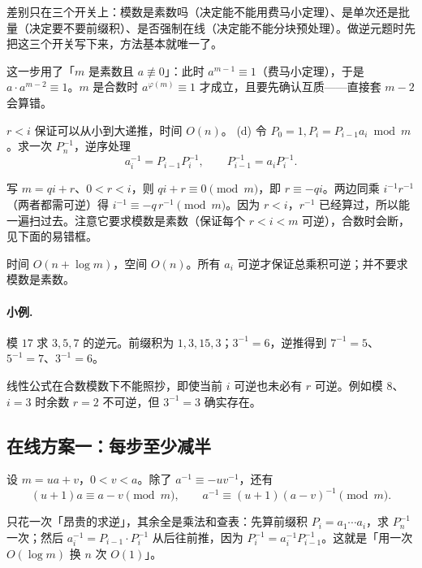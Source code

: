 \documentclass[UTF8,a4paper,11pt,twoside,openright,fontset=fandol]{ctexbook}
\theoremstyle{definition}
\begin{document}
\begin{tip}[为什么要分五类]
差别只在三个开关上：模数是素数吗（决定能不能用费马小定理）、是单次还是批量（决定要不要前缀积）、是否强制在线（决定能不能分块预处理）。做逆元题时先把这三个开关写下来，方法基本就唯一了。
\end{tip}

\begin{tip}
这一步用了「$m$ 是素数且 $a\not\equiv0$」：此时 $a^{m-1}\equiv1$（费马小定理），于是 $a\cdot a^{m-2}\equiv1$。$m$ 是合数时 $a^{\varphi(m)}\equiv1$ 才成立，且要先确认互质——直接套 $m-2$ 会算错。
\end{tip}

$r<i$ 保证可以从小到大递推，时间 $O(n)$。
(d) 令 $P_0=1,P_i=P_{i-1}a_i\bmod m$。求一次 $P_n^{-1}$，逆序处理
\[
 a_i^{-1}=P_{i-1}P_i^{-1},\qquad P_{i-1}^{-1}=a_iP_i^{-1}.
\]

\begin{tip}[线性递推逆元公式是怎么来的]
写 $m=qi+r$、$0<r<i$，则 $qi+r\equiv0\pmod m$，即 $r\equiv-qi$。两边同乘 $i^{-1}r^{-1}$（两者都需可逆）得 $i^{-1}\equiv-q\,r^{-1}\pmod m$。因为 $r<i$，$r^{-1}$ 已经算过，所以能一遍扫过去。注意它要求模数是素数（保证每个 $r<i<m$ 可逆），合数时会断，见下面的易错框。
\end{tip}

时间 $O(n+\log m)$，空间 $O(n)$。所有 $a_i$ 可逆才保证总乘积可逆；并不要求模数是素数。

\paragraph{小例.} 模 $17$ 求 $3,5,7$ 的逆元。前缀积为 $1,3,15,3$；$3^{-1}=6$，逆推得到 $7^{-1}=5$、$5^{-1}=7$、$3^{-1}=6$。

\begin{pitfall}
线性公式在合数模数下不能照抄，即使当前 $i$ 可逆也未必有 $r$ 可逆。例如模 $8$、$i=3$ 时余数 $r=2$ 不可逆，但 $3^{-1}=3$ 确实存在。
\end{pitfall}

\subsection{在线方案一：每步至少减半}
设 $m=ua+v$，$0<v<a$。除了 $a^{-1}\equiv-u v^{-1}$，还有
\[
 (u+1)a\equiv a-v\pmod m,
 \qquad a^{-1}\equiv(u+1)(a-v)^{-1}\pmod m.
\]

\begin{tip}[前缀积批量求逆元的想法]
只花一次「昂贵的求逆」，其余全是乘法和查表：先算前缀积 $P_i=a_1\cdots a_i$，求 $P_n^{-1}$ 一次；然后 $a_i^{-1}=P_{i-1}\cdot P_i^{-1}$ 从后往前推，因为 $P_i^{-1}=a_i^{-1}P_{i-1}^{-1}$。这就是「用一次 $O(\log m)$ 换 $n$ 次 $O(1)$」。
\end{tip}
\end{document}
